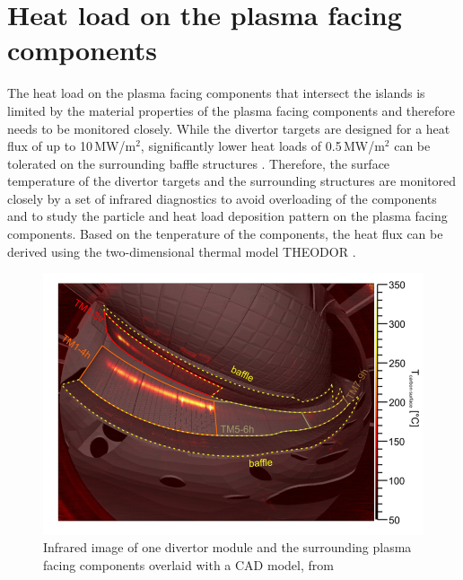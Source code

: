 \section{Heat load on the plasma facing components}

The heat load on the plasma facing components that intersect the islands is limited by the material properties of the plasma facing components and therefore needs to be monitored closely. While the divertor targets are designed for a heat flux of up to 10\,MW/m$^2$, significantly lower heat loads of 0.5\,MW/m$^2$ can be tolerated on the surrounding baffle structures \cite{Jakubowski2018}. Therefore, the surface temperature of the divertor targets and the surrounding structures are monitored closely by a set of infrared diagnostics to avoid overloading of the components and to study the particle and heat load deposition pattern on the plasma facing components. Based on the tenperature of the components, the heat flux can be derived using the two-dimensional thermal model THEODOR \cite{Sieglin2015}.
\begin{figure}[!htb]
    \centering
    \includegraphics[scale = 0.5]{images/ir_image.png}
    \caption{Infrared image of one divertor module and the surrounding plasma facing components overlaid with a CAD model, from \cite{Jakubowski2018}} \label{fig:2}
\end{figure}
